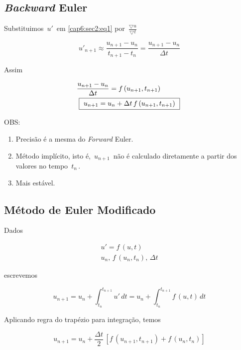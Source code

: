 \subsection{\textit{Backward} Euler}

Substituimos $ \, u' \, $ em \ref{cap6:sec2:eq1} por $ \, \displaystyle \frac{\bigtriangledown u}{\bigtriangledown t} \, $

\begin{equation}
  \label{cap6:sec2:eq5}
  u'_{n+1} \approx \frac{u_{n+1} - u_n}{t_{n+1} - t_n} = \frac{u_{n+1} - u_n}{\Delta t}
\end{equation}

Assim

\begin{eqnarray}
 & \displaystyle \frac{u_{n+1} - u_n}{\Delta t} = f \, (u_{n+1}, t_{n+1}) \nonumber \\
 \label{cap6:sec2:eq6}
 & \mbox{ \framebox{ $ u_{n+1} = u_n + \Delta t \, f \, (u_{n+1}, t_{n+1}) $ } }
\end{eqnarray}

OBS:

\begin{enumerate}

\item Precisão é a mesma do \textit{Forward} Euler.

\item Método implícito, isto é, $ \, u_{n+1} \, $ não é calculado diretamente a partir dos valores no tempo $ \, t_n \, $.

\item Mais estável.

\end{enumerate}

\subsection{Método de Euler Modificado}

Dados

\[
 \begin{array}{l}
  u' = f \, (u, t) \\
  u_n, \, f \, (u_n, t_n), \, \Delta t
 \end{array}
\]

escrevemos

\begin{equation}
 \label{cap6:sec2:eq7}
 u_{n+1} = u_n + \int^{t_{n+1}}_{t_n} u' \, dt = u_n + \int^{t_{n+1}}_{t_n} f \, (u, t) \, dt
\end{equation}

Aplicando regra do trapézio para integração, temos

\begin{equation}
 \label{cap6:sec2:eq8}
 u_{n+1} = u_n + \frac{\Delta t}{2} \, [f \, (u_{n+1}, t_{n+1}) + f \, (u_n, t_n)]
\end{equation}
